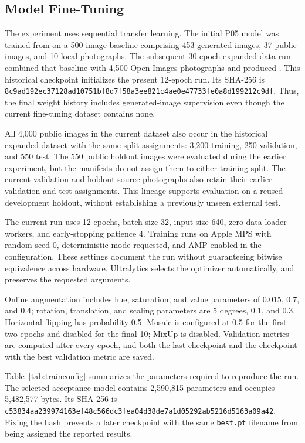 \documentclass[12pt,a4paper]{article}
\begin{document}
\subsection{Model Fine-Tuning}
\label{sec:finetuning}

The experiment uses sequential transfer learning. The initial P05 model was trained from  on a 500-image baseline comprising 453 generated images, 37 public images, and 10 local photographs. The subsequent 30-epoch expanded-data run combined that baseline with 4,500 Open Images photographs and produced . This historical checkpoint initializes the present 12-epoch run. Its SHA-256 is {\footnotesize\texttt{8c9ad192ec37128ad10751bf8d7f58a3ee821c4ae0e47733fe0a8d199212c9df}}. Thus, the final weight history includes generated-image supervision even though the current fine-tuning dataset contains none.

All 4,000 public images in the current dataset also occur in the historical expanded dataset with the same split assignments: 3,200 training, 250 validation, and 550 test. The 550 public holdout images were evaluated during the earlier experiment, but the manifests do not assign them to either training split. The current validation and holdout source photographs also retain their earlier validation and test assignments. This lineage supports evaluation on a reused development holdout, without establishing a previously unseen external test.

The current run uses 12 epochs, batch size 32, input size 640, zero data-loader workers, and early-stopping patience 4. Training runs on Apple MPS with random seed 0, deterministic mode requested, and AMP enabled in the configuration. These settings document the run without guaranteeing bitwise equivalence across hardware. Ultralytics selects the optimizer automatically, and  preserves the requested arguments.

Online augmentation includes hue, saturation, and value parameters of 0.015, 0.7, and 0.4; rotation, translation, and scaling parameters are 5 degrees, 0.1, and 0.3. Horizontal flipping has probability 0.5. Mosaic is configured at 0.5 for the first two epochs and disabled for the final 10; MixUp is disabled. Validation metrics are computed after every epoch, and both the last checkpoint and the checkpoint with the best validation metric are saved.

Table~\ref{tab:trainconfig} summarizes the parameters required to reproduce the run. The selected acceptance model contains 2,590,815 parameters and occupies 5,482,577 bytes. Its SHA-256 is {\footnotesize\texttt{c53834aa239974163ef48c566dc3fea04d38de7a1d05292ab5216d5163a09a42}}. Fixing the hash prevents a later checkpoint with the same \texttt{best.pt} filename from being assigned the reported results.
\end{document}
